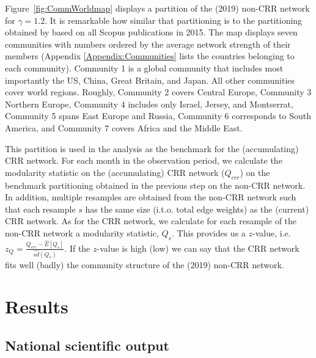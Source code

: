 Figure~\ref{fig:CommWorldmap} displays a partition of the (2019) non-CRR network for $\gamma=1.2$. It is remarkable how similar that partitioning is to the partitioning obtained by \citet[][Fig.5b]{fitzgerald2021academia} based on all Scopus publications in 2015. The map displays seven communities with numbers ordered by the average network strength of their members (Appendix \ref{Appendix:Communities} lists the countries belonging to each community). Community 1 is a global community that includes most importantly the US, China, Great Britain, and Japan. All other communities cover world regions. Roughly, Community 2 covers Central Europe, Community 3 Northern Europe, Community 4 includes only Israel, Jersey, and Montserrat, Community 5 spans East Europe and Russia, Community 6 corresponds to South America, and Community 7 covers Africa and the Middle East. 

This partition is used in the analysis as the benchmark for the (accumulating) CRR network. For each month in the observation period, we calculate the modularity statistic on the (accumulating) CRR network ($Q_{crr}$) on the benchmark partitioning obtained in the previous step on the non-CRR network. In addition, multiple resamples are obtained from the non-CRR network such that each resample $s$ has the same size (i.t.o. total edge weights) as the (current) CRR network. As for the CRR network, we calculate for each resample of the non-CRR network a modularity statistic, $Q_s$. This provides us a $z$-value, i.e. $z_Q =  \frac{Q_{crr} - \hat{E}\left[ Q_s \right]}{\widehat{sd}(Q_s)}$. If the $z$-value is high (low) we can say that the CRR network fits well (badly) the community structure of the (2019) non-CRR network. 



\section{Results}


\subsection{National scientific output}
\label{sec:NatSciProd}

